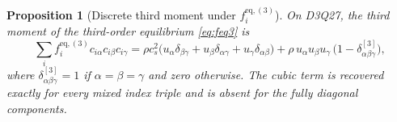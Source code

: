 \documentclass[preprint,11pt]{elsarticle}
\newtheorem{proposition}{Proposition}
\newcommand{\cs}{c_s}
\newcommand{\eq}{\mathrm{eq}}
\begin{document}
\begin{proposition}[Discrete third moment under $f_i^{\eq,(3)}$]
\label{prop:disc3order3}
On D3Q27, the third moment of the third-order equilibrium \eqref{eq:feq3} is
\begin{equation}
\sum_i f_i^{\eq,(3)}c_{i\alpha}c_{i\beta}c_{i\gamma}
=\rho\cs^{2}\big(u_\alpha\delta_{\beta\gamma}+u_\beta\delta_{\alpha\gamma}
+u_\gamma\delta_{\alpha\beta}\big)
+\rho\,u_\alpha u_\beta u_\gamma\,\big(1-\delta^{[3]}_{\alpha\beta\gamma}\big),
\label{eq:disc3order3}
\end{equation}
where $\delta^{[3]}_{\alpha\beta\gamma}=1$ if $\alpha=\beta=\gamma$ and zero
otherwise. The cubic term is recovered exactly for every mixed index triple and
is absent for the fully diagonal components.
\end{proposition}
\end{document}
